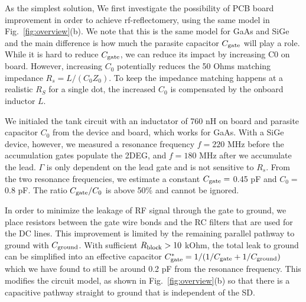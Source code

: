 \documentclass[twocolumn]{article}
\begin{document}
	
	As the simplest solution, We first investigate the possibility of PCB board improvement in order to achieve rf-reflectomery, using the same model in Fig.\ \ref{fig:overview}(b). We note that this is the same model for GaAs and SiGe and the main difference is how much the parasite capacitor $C_{\rm gate}$ will play a role. While it is hard to reduce $C_{\rm gate}$, we can reduce its impact by increasing C0 on board. However, increasing $C_0$ potentially reduces the 50 Ohms matching impedance $R_s=L/(C_0Z_0)$. To keep the impedance matching happens at a realistic $R_S$ for a single dot, the increased $C_0$ is compensated by the onboard inductor $L$.
	
	We initialed the tank circuit with an inductator of 760 nH on board and parasite capacitor $C_0$ from the device and board, which works for GaAs. With a SiGe device, however, we measured a resonance frequency $f=220$ MHz before the accumulation gates populate the 2DEG, and $f = 180$ MHz after we accumulate the lead. $\Gamma$ is only dependent on the lead gate and is not sensitive to $R_s$. From the two resonance frequencies, we estimate a constant $C_{\rm gate} =$  0.45 pF and $C_0=$ 0.8 pF. The ratio $C_{\rm gate}/C_0$ is above 50\% and cannot be ignored. 
	
	In order to minimize the leakage of RF signal through the gate to ground, we place resistors between the gate wire bonds and the RC filters that are used for the DC lines. This improvement is limited by the remaining parallel pathway to ground with $C_{\rm ground}$. With sufficient $R_{\rm block} > 10$ kOhm, the total leak to ground can be simplified into an effective capacitor $C^*_{\rm gate} = 1/(1/{C_{\rm gate}}+1/C_{\rm ground})$ which we have found to still be around 0.2 pF from the resonance frequency. This modifies the circuit model, as shown in Fig.\ \ref{fig:overview}(b) so that there is a capacitive pathway straight to ground that is independent of the SD.   
	
\end{document}
